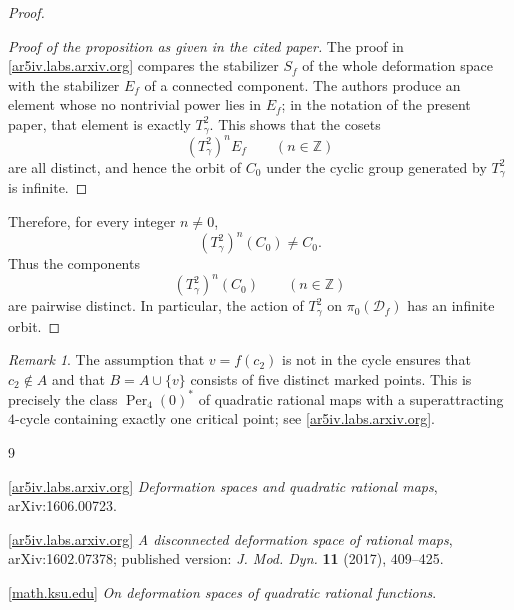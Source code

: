 \documentclass[11pt]{article}
\theoremstyle{remark}
\newtheorem{remark}{Remark}
\begin{document}
\begin{proof}
\begin{proof}[Proof of the proposition as given in the cited paper]
The proof in
\href{https://ar5iv.labs.arxiv.org/html/1602.07378}{[ar5iv.labs.arxiv.org]} compares the
stabilizer \(S_f\) of the whole deformation space with the stabilizer \(E_f\) of a connected
component. The authors produce an element whose no nontrivial power lies in \(E_f\); in the
notation of the present paper, that element is exactly \(T_\gamma^2\). This shows that the
cosets
\[
(T_\gamma^2)^n E_f\qquad (n\in\mathbb Z)
\]
are all distinct, and hence the orbit of \(C_0\) under the cyclic group generated by
\(T_\gamma^2\) is infinite.
\end{proof}

Therefore, for every integer \(n\neq 0\),
\[
(T_\gamma^2)^n(C_0)\neq C_0.
\]
Thus the components
\[
(T_\gamma^2)^n(C_0)\qquad (n\in\mathbb Z)
\]
are pairwise distinct. In particular, the action of \(T_\gamma^2\) on
\(\pi_0(\mathcal D_f)\) has an infinite orbit.
\end{proof}

\begin{remark}
The assumption that \(v=f(c_2)\) is not in the cycle ensures that \(c_2\notin A\) and that
\(B=A\cup\{v\}\) consists of five distinct marked points. This is precisely the class
\(\operatorname{Per}_4(0)^*\) of quadratic rational maps with a superattracting \(4\)-cycle
containing exactly one critical point; see
\href{https://ar5iv.labs.arxiv.org/html/1602.07378}{[ar5iv.labs.arxiv.org]}.
\end{remark}

\begin{thebibliography}{9}

\href{https://ar5iv.labs.arxiv.org/html/1606.00723}{[ar5iv.labs.arxiv.org]}
\emph{Deformation spaces and quadratic rational maps}, arXiv:1606.00723.

\href{https://ar5iv.labs.arxiv.org/html/1602.07378}{[ar5iv.labs.arxiv.org]}
\emph{A disconnected deformation space of rational maps}, arXiv:1602.07378;
published version: \emph{J. Mod. Dyn.} \textbf{11} (2017), 409--425.

\href{https://www.math.ksu.edu/~tanyaf/FKS.pdf}{[math.ksu.edu]}
\emph{On deformation spaces of quadratic rational functions}.

\end{thebibliography}
\end{document}
